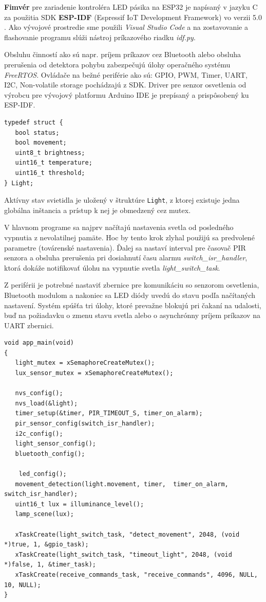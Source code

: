 \documentclass[12pt, a4paper]{article}
\begin{document}
\textbf{Fimvér} pre zariadenie kontroléra LED pásika na ESP32 je napísaný v jazyku C za použitia SDK \textbf{ESP-IDF} (Espressif IoT Development Framework) vo verzii 5.0 \cite{noauthor_esp-idf_nodate}. Ako vývojové prostredie sme použili \emph{Visual Studio Code} a na zostavovanie a flashovanie programu slúži nástroj príkazového riadku \emph{idf.py}.

Obsluhu činností ako sú napr. príjem príkazov cez Bluetooth alebo obsluha prerušenia od detektora pohybu zabezpečujú úlohy operačného systému \emph{FreeRTOS}. Ovládače na bežné periférie ako sú: GPIO, PWM, Timer, UART, I2C, Non-volatile storage pochádzajú z SDK. Driver pre senzor osvetlenia od výrobcu pre vývojový platformu Arduino IDE je prepísaný a prispôsobený ku ESP-IDF.

\begin{lstlisting}[style=cstyle,caption=Štruktúra vlastností svietidla,label={lst:light-settings}]
typedef struct {
   bool status;
   bool movement;
   uint8_t brightness;
   uint16_t temperature;
   uint16_t threshold;
} Light;
\end{lstlisting}
Aktívny stav svietidla je uložený v štruktúre \verb|Light|, z ktorej existuje jedna globálna inštancia a prístup k nej je obmedzený cez mutex.

V hlavnom programe sa najprv načítajú nastavenia svetla od posledného vypnutia z nevolatilnej pamäte. Hoc by tento krok zlyhal použijú sa predvolené parametre (továrenské nastavenia). Ďalej sa nastaví interval pre časovač PIR senzora a obsluha prerušenia pri dosiahnutí času alarmu \emph{switch\_isr\_handler}, ktorá dokáže notifikovať úlohu na vypnutie svetla \emph{light\_switch\_task}.

Z periférii je potrebné nastaviť zbernice pre komunikáciu so senzorom osvetlenia, Bluetooth modulom a nakoniec sa LED diódy uvedú do stavu podľa načítaných nastavení. Systém spúšťa tri úlohy, ktoré prevažne blokujú pri čakaní na udalosti, buď na požiadavku o zmenu stavu svetla alebo o asynchrónny príjem príkazov na UART zbernici.

\begin{lstlisting}[style=cstyle,caption=Inicializácia hardvéru a spustenie úloh,label={lst:firmware-main},
morekeywords={xTaskCreate,xSemaphoreCreateMutex,timer_on_alarm,switch_isr_handler,light_switch_task,receive_commands_task}]
void app_main(void)
{
   light_mutex = xSemaphoreCreateMutex();
   lux_sensor_mutex = xSemaphoreCreateMutex();

   nvs_config(); 
   nvs_load(&light);
   timer_setup(&timer, PIR_TIMEOUT_S, timer_on_alarm);
   pir_sensor_config(switch_isr_handler);
   i2c_config();
   light_sensor_config();
   bluetooth_config();

	led_config();
   movement_detection(light.movement, timer,  timer_on_alarm, switch_isr_handler);
   uint16_t lux = illuminance_level();
   lamp_scene(lux); 

   xTaskCreate(light_switch_task, "detect_movement", 2048, (void *)true, 1, &gpio_task);
   xTaskCreate(light_switch_task, "timeout_light", 2048, (void *)false, 1, &timer_task);
   xTaskCreate(receive_commands_task, "receive_commands", 4096, NULL, 10, NULL);
}
\end{lstlisting}
\end{document}
